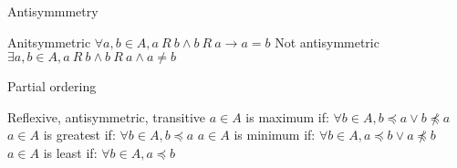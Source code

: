 \begin{itemize}
\bulletitem Antisymmmetry
\begin{itemize}
\bulletitem Anitsymmetric \( \forall a,b \in A, a \: R \: b \land b \: R \: a \rightarrow a=b \)
\bulletitem Not antisymmetric \( \exists a,b \in A, a \: R \: b \land b \: R \: a \land a \neq b \)
\end{itemize}
\bulletitem Partial ordering
\begin{itemize}
\bulletitem Reflexive, antisymmetric, transitive
\bulletitem \( a \in A \) is maximum if: \( \forall b \in A, b \preceq a \lor b \not\preceq a \)
\bulletitem \( a \in A \) is greatest if: \( \forall b \in A, b \preceq a \)
\bulletitem \( a \in A \) is minimum if: \( \forall b \in A, a \preceq b \lor a \not\preceq b \)
\bulletitem \( a \in A \) is least if: \( \forall b \in A, a \preceq b \)
\end{itemize}
\end{itemize}